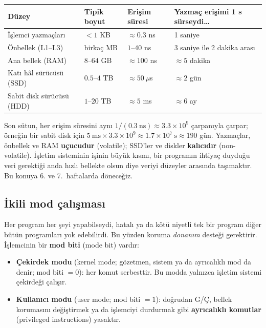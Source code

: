 \documentclass[11pt,a4paper]{article}
\newcommand{\term}[1]{\textbf{\color{mintdeep}#1}}
\begin{document}
\begin{center}
\renewcommand{\arraystretch}{1.3}
\begin{tabular}{@{}llll@{}}
\toprule
\textbf{Düzey} & \textbf{Tipik boyut} & \textbf{Erişim süresi} & \textbf{Yazmaç erişimi 1 s sürseydi\dots} \\
\midrule
İşlemci yazmaçları & $< 1$ KB & $\approx 0.3$ ns & 1 saniye \\
Önbellek (L1--L3) & birkaç MB & $1$--$40$ ns & 3 saniye ile 2 dakika arası \\
Ana bellek (RAM) & $8$--$64$ GB & $\approx 100$ ns & $\approx 5$ dakika \\
Katı hâl sürücüsü (SSD) & $0.5$--$4$ TB & $\approx 50\ \mu$s & $\approx 2$ gün \\
Sabit disk sürücüsü (HDD) & $1$--$20$ TB & $\approx 5$ ms & $\approx 6$ ay \\
\bottomrule
\end{tabular}
\end{center}

Son sütun, her erişim süresini aynı $1/(0.3\ \text{ns}) \approx 3.3\times10^{9}$ çarpanıyla çarpar; örneğin bir sabit disk için $5\ \text{ms} \times 3.3\times10^{9} \approx 1.7\times10^{7}\ \text{s} \approx 190$ gün. Yazmaçlar, önbellek ve RAM \textbf{uçucudur} (volatile); SSD'ler ve diskler \textbf{kalıcıdır} (non-volatile). İşletim sisteminin işinin büyük kısmı, bir programın ihtiyaç duyduğu veri gerektiği anda hızlı bellekte olsun diye veriyi düzeyler arasında taşımaktır. Bu konuya 6. ve 7.\ haftalarda döneceğiz.

\subsection{İkili mod çalışması}
\label{sec:dualmode}

Her program her şeyi yapabilseydi, hatalı ya da kötü niyetli tek bir program diğer bütün programları yok edebilirdi. Bu yüzden koruma \emph{donanım} desteği gerektirir. İşlemcinin bir \term{mod biti} (mode bit) vardır:

\begin{itemize}
  \item \textbf{Çekirdek modu} (kernel mode; gözetmen, sistem ya da ayrıcalıklı mod da denir; mod biti $=0$): her komut serbesttir. Bu modda yalnızca işletim sistemi çekirdeği çalışır.
  \item \textbf{Kullanıcı modu} (user mode; mod biti $=1$): doğrudan G/Ç, bellek korumasını değiştirmek ya da işlemciyi durdurmak gibi \term{ayrıcalıklı komutlar} (privileged instructions) yasaktır.
\end{itemize}
\end{document}

